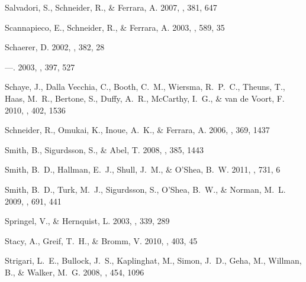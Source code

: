\documentclass[apj]{emulateapj}
\begin{document}
\begin{thebibliography}{108}
{Salvadori}, S., {Schneider}, R., \& {Ferrara}, A. 2007, \mnras, 381, 647

{Scannapieco}, E., {Schneider}, R., \& {Ferrara}, A. 2003, \apj, 589, 35

{Schaerer}, D. 2002, \aap, 382, 28

---. 2003, \aap, 397, 527

{Schaye}, J., {Dalla Vecchia}, C., {Booth}, C.~M., {Wiersma}, R.~P.~C.,
  {Theuns}, T., {Haas}, M.~R., {Bertone}, S., {Duffy}, A.~R., {McCarthy},
  I.~G., \& {van de Voort}, F. 2010, \mnras, 402, 1536

{Schneider}, R., {Omukai}, K., {Inoue}, A.~K., \& {Ferrara}, A. 2006, \mnras,
  369, 1437

{Smith}, B., {Sigurdsson}, S., \& {Abel}, T. 2008, \mnras, 385, 1443

{Smith}, B.~D., {Hallman}, E.~J., {Shull}, J.~M., \& {O'Shea}, B.~W. 2011,
  \apj, 731, 6

{Smith}, B.~D., {Turk}, M.~J., {Sigurdsson}, S., {O'Shea}, B.~W., \& {Norman},
  M.~L. 2009, \apj, 691, 441

{Springel}, V., \& {Hernquist}, L. 2003, \mnras, 339, 289

{Stacy}, A., {Greif}, T.~H., \& {Bromm}, V. 2010, \mnras, 403, 45

{Strigari}, L.~E., {Bullock}, J.~S., {Kaplinghat}, M., {Simon}, J.~D., {Geha},
  M., {Willman}, B., \& {Walker}, M.~G. 2008, \nat, 454, 1096


\end{thebibliography}
\end{document}
